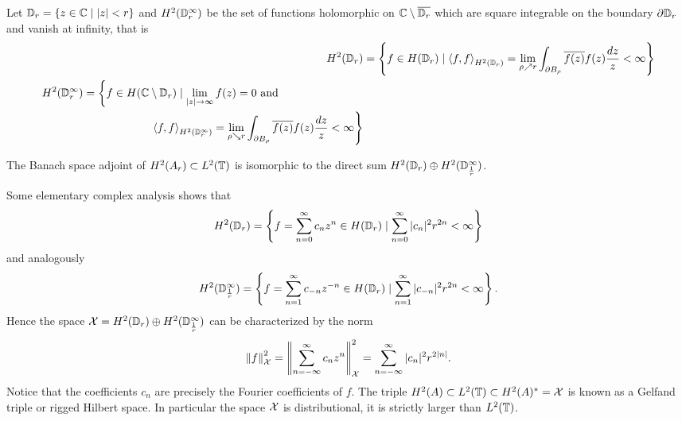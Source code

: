 Let $\mathbb{D}_r = \left\{ z \in \mathbb{C} \mid |z| < r \right\}$ and 
$H^2 (\mathbb{D}_r^\infty)$ be the set of functions holomorphic on 
$\mathbb{C} \setminus \overline{\mathbb{D}_r}$ which are square integrable on the boundary 
$\partial \mathbb{D}_r$ and vanish at infinity, that is
\begin{align}
    H^2 (\mathbb{D}_r) &= \left\{ f \in H(\mathbb{D}_r) \mid 
    \left\langle f, f \right\rangle_{H^2(\mathbb{D}_r)} = 
    \lim_{\rho \nearrow r} \int_{\partial B_\rho} \overline{f (z)} f(z) \frac{dz}{z} < \infty \right\} \\
    \begin{split}
        H^2 (\mathbb{D}_r^\infty) &= \left\{ f \in H(\mathbb{C} \setminus \mathbb{D}_r) \mid 
        \lim_{|z| \to \infty} f(z) = 0 \text{ and } \right.\\
        &\quad\quad\quad\quad\quad\quad
        \left.\left\langle f, f \right\rangle_{H^2(\mathbb{D}_r^\infty)} = 
        \lim_{\rho \searrow r} 
        \int_{\partial B_\rho} \overline{f (z)} f(z) \frac{dz}{z} < \infty \right\} 
    \end{split}
\end{align}

\begin{theorem}
    The Banach space adjoint of $H^2(A_r) \subset L^2(\mathbb{T})$ is isomorphic to the direct 
    sum $H^2 (\mathbb{D}_r) \oplus H^2 (\mathbb{D}_{\frac{1}{r}}^\infty)$. 
\end{theorem}

Some elementary complex analysis shows that 
\begin{equation}
    H^2 (\mathbb{D}_r) = \left\{ f = \sum_{n=0}^{\infty} c_n z^n \in H(\mathbb{D}_r) \mid 
    \sum_{n=0}^{\infty} |c_n|^2 r^{2n} < \infty\right\}
\end{equation}
and analogously
\begin{equation}
    H^2 (\mathbb{D}_{\frac{1}{r}}^\infty) = \left\{ f = \sum_{n=1}^{\infty} c_{-n} z^{-n} \in H(\mathbb{D}_r) \mid 
    \sum_{n=1}^{\infty} |c_{-n}|^2 r^{2n} < \infty\right\} . 
\end{equation}
Hence the space $\mathcal{X} = H^2 (\mathbb{D}_r) \oplus H^2 (\mathbb{D}_{\frac{1}{r}}^\infty)$ can be 
characterized by the norm
\begin{equation}
    \left\| f \right\|_{\mathcal{X}}^2 = \left\| \sum_{n=-\infty}^{\infty} c_n z^n \right\|_{\mathcal{X}}^2 
    = \sum_{n=-\infty}^{\infty} |c_n|^2 r^{2 |n|} . 
\end{equation}
Notice that the coefficients $c_n$ are precisely the Fourier coefficients of $f$. The 
triple $H^2 (A) \subset L^2 (\mathbb{T}) \subset H^2 (A)^* = \mathcal{X}$ is known as a Gelfand triple 
or rigged Hilbert space. In particular the space $\mathcal{X}$ is distributional, it is 
strictly larger than $L^2 (\mathbb{T})$. 

